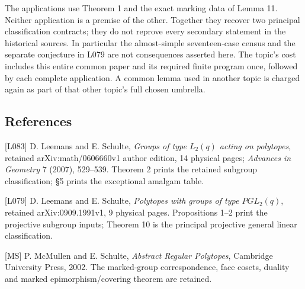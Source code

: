 \documentclass[
  11pt,
  a4paper,
]{article}
\begin{document}
The applications use Theorem 1 and the exact marking data of Lemma 11.
Neither application is a premise of the other. Together they recover two
principal classification contracts; they do not reprove every secondary
statement in the historical sources. In particular the almost-simple
seventeen-case census and the separate conjecture in L079 are not
consequences asserted here. The topic's cost includes this entire common
paper and its required finite program once, followed by each complete
application. A common lemma used in another topic is charged again as
part of that other topic's full chosen umbrella.

\subsection{References}\label{references}

{[}L083{]} D. Leemans and E. Schulte, \emph{Groups of type \(L_2(q)\)
acting on polytopes}, retained arXiv:math/0606660v1 author edition, 14
physical pages; \emph{Advances in Geometry} 7 (2007), 529--539. Theorem
2 prints the retained subgroup classification; §5 prints the exceptional
amalgam table.

{[}L079{]} D. Leemans and E. Schulte, \emph{Polytopes with groups of
type \(PGL_2(q)\)}, retained arXiv:0909.1991v1, 9 physical pages.
Propositions 1--2 print the projective subgroup inputs; Theorem 10 is
the principal projective general linear classification.

{[}MS{]} P. McMullen and E. Schulte, \emph{Abstract Regular Polytopes},
Cambridge University Press, 2002. The marked-group correspondence, face
cosets, duality and marked epimorphism/covering theorem are retained.
\end{document}
